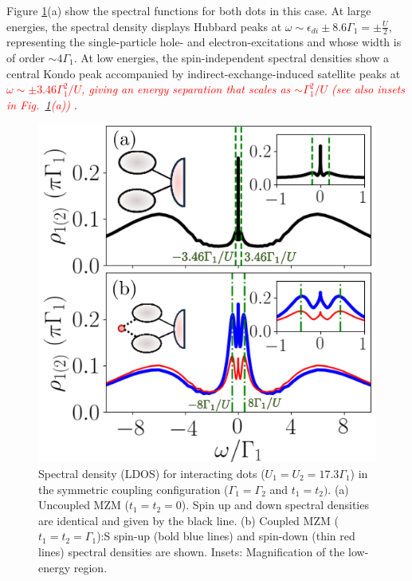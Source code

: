 \documentclass[showpacs,aps,prb,reprint,superscriptaddress]{revtex4-2}
\newcommand{\change}[1]{\textcolor{red}{\sl#1}}
\begin{document}
Figure \ref{fig:NRG_Majorana}(a) show the spectral functions for both dots in this case. At large energies, the spectral density displays Hubbard peaks at $\omega \sim \epsilon_{di} \pm 8.6\Gamma_1 = \pm \frac{U}{2}$, representing the single-particle hole- and electron-excitations and whose width is of order $\sim 4\Gamma_1$. At low energies, the spin-independent spectral densities show a central Kondo peak accompanied by indirect-exchange-induced satellite peaks at \change{ $\omega \sim \pm 3.46 \Gamma^2_1/U$, giving an energy separation that scales as $\sim \Gamma^2_1/U$ (see also insets in Fig.\ \ref{fig:NRG_Majorana}(a)) \cite{Liao:JournalofMagnetismandMagneticMaterials:377:354-361:2015}}. 





        \begin{figure}[bt]
        \begin{center}
        \includegraphics[width=1.0\columnwidth]{Graficos/NRG_t1zero_t1eqt2.png}
        \caption{  \label{fig:NRG_Majorana} Spectral density (LDOS) for interacting dots ($U_1\!=\!U_2\!=\!17.3 \Gamma_1$) in the symmetric coupling configuration ($\Gamma_1\!=\!\Gamma_2$ and $t_1\!=\!t_2)$.  (a) Uncoupled MZM ($t_1\!=\!t_2\!=\!0$). Spin up and down spectral densities are identical and given by the black line. (b) Coupled MZM ($t_1\!=\!t_2\!=\!\Gamma_1$):S spin-up (bold blue lines) and  spin-down (thin red lines) spectral densities are shown. Insets: Magnification of the low-energy region. 
        }
        \end{center}
        \end{figure}
\end{document}
